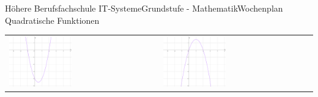 \documentclass[oneside,openany,headings=optiontotoc,11pt,numbers=noenddot]{scrreprt}
\begin{document}
\begin{worksheet}{Höhere Berufsfachschule IT-Systeme}{Grundstufe - Mathematik}{Wochenplan Quadratische Funktionen}
\begin{framed}
\begin{tabularx}{\textwidth}{XX}
				\includegraphics[width=0.43\textwidth]{../99_Bilder/WP7FrA.png} & \includegraphics[width=0.43\textwidth]{../99_Bilder/WP7FrC.png}\\
			\end{tabularx}
		\end{framed}
	\end{worksheet}
\end{document}
